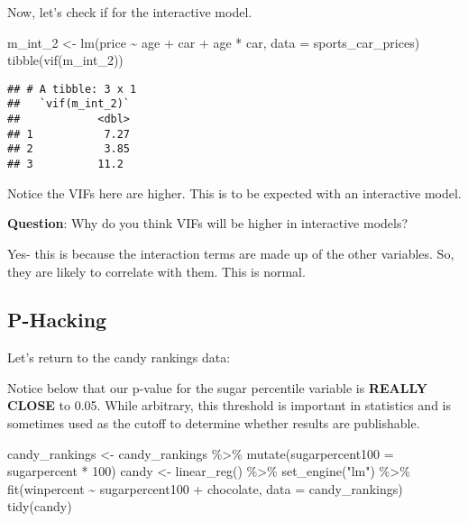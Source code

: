 \documentclass[
]{article}
\newenvironment{Shaded}{\begin{snugshade}}{\end{snugshade}}
\newcommand{\AttributeTok}[1]{\textcolor[rgb]{0.77,0.63,0.00}{#1}}
\newcommand{\DecValTok}[1]{\textcolor[rgb]{0.00,0.00,0.81}{#1}}
\newcommand{\FunctionTok}[1]{\textcolor[rgb]{0.00,0.00,0.00}{#1}}
\newcommand{\NormalTok}[1]{#1}
\newcommand{\OtherTok}[1]{\textcolor[rgb]{0.56,0.35,0.01}{#1}}
\newcommand{\SpecialCharTok}[1]{\textcolor[rgb]{0.00,0.00,0.00}{#1}}
\newcommand{\StringTok}[1]{\textcolor[rgb]{0.31,0.60,0.02}{#1}}
\begin{document}
Now, let's check if for the interactive model.

\begin{Shaded}
\begin{Highlighting}[]
\NormalTok{m\_int\_2 }\OtherTok{\textless{}{-}} \FunctionTok{lm}\NormalTok{(price }\SpecialCharTok{\textasciitilde{}}\NormalTok{ age }\SpecialCharTok{+}\NormalTok{ car }\SpecialCharTok{+}\NormalTok{ age }\SpecialCharTok{*}\NormalTok{ car, }
            \AttributeTok{data =}\NormalTok{ sports\_car\_prices)}
\FunctionTok{tibble}\NormalTok{(}\FunctionTok{vif}\NormalTok{(m\_int\_2))}
\end{Highlighting}
\end{Shaded}

\begin{verbatim}
## # A tibble: 3 x 1
##   `vif(m_int_2)`
##            <dbl>
## 1           7.27
## 2           3.85
## 3          11.2
\end{verbatim}

Notice the VIFs here are higher. This is to be expected with an
interactive model.

\textbf{Question}: Why do you think VIFs will be higher in interactive
models?

Yes- this is because the interaction terms are made up of the other
variables. So, they are likely to correlate with them. This is normal.

\hypertarget{p-hacking}{%
\subsection{P-Hacking}\label{p-hacking}}

Let's return to the candy rankings data:

Notice below that our p-value for the sugar percentile variable is
\textbf{REALLY CLOSE} to 0.05. While arbitrary, this threshold is
important in statistics and is sometimes used as the cutoff to determine
whether results are publishable.

\begin{Shaded}
\begin{Highlighting}[]
\NormalTok{candy\_rankings }\OtherTok{\textless{}{-}}\NormalTok{ candy\_rankings }\SpecialCharTok{\%\textgreater{}\%}
  \FunctionTok{mutate}\NormalTok{(}\AttributeTok{sugarpercent100 =}\NormalTok{ sugarpercent }\SpecialCharTok{*} \DecValTok{100}\NormalTok{)}
\NormalTok{candy }\OtherTok{\textless{}{-}} \FunctionTok{linear\_reg}\NormalTok{() }\SpecialCharTok{\%\textgreater{}\%}
  \FunctionTok{set\_engine}\NormalTok{(}\StringTok{"lm"}\NormalTok{) }\SpecialCharTok{\%\textgreater{}\%}
  \FunctionTok{fit}\NormalTok{(winpercent }\SpecialCharTok{\textasciitilde{}}\NormalTok{ sugarpercent100 }\SpecialCharTok{+}\NormalTok{ chocolate, }\AttributeTok{data =}\NormalTok{ candy\_rankings) }
\FunctionTok{tidy}\NormalTok{(candy)}
\end{Highlighting}
\end{Shaded}
\end{document}
